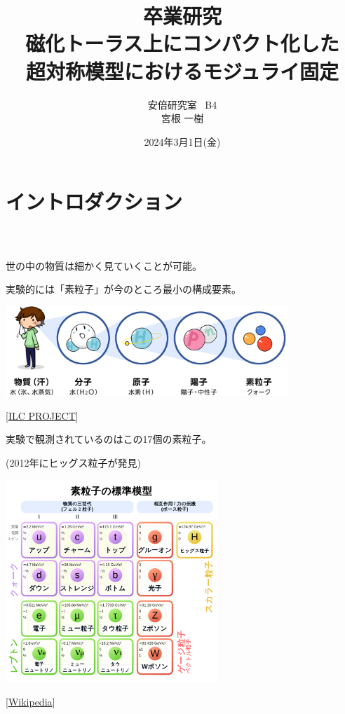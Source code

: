 \documentclass[
  unicode,a4paper,11pt,
  xcolor = {dvipsnames,svgnames},
  hyperref ={colorlinks=true,citecolor=Navy,linkcolor=NavyBlue,urlcolor=purple},
  ja=standard,lualatex
]{beamer}
\title{
  卒業研究
  \texorpdfstring{\\}{}
  \texorpdfstring{\vspace*{5pt}}{}
  {\LARGE
    磁化トーラス上にコンパクト化した
    \\
    超対称模型におけるモジュライ固定
  }
}
\author{
  安倍研究室 \ B4
  \texorpdfstring{\\}{}
  \texorpdfstring{\vspace*{3pt}}{}
  宮根 一樹
}
\date{2024年3月1日(金)}
\begin{document}
\begin{frame}
  \titlepage
\end{frame}


\section{イントロダクション}

\begin{frame}[plain]
  \frametitle{\ }
  \huge \secname
\end{frame}

\begin{frame}
  世の中の物質は細かく見ていくことが可能。

  実験的には「素粒子」が今のところ最小の構成要素。

  \begin{center}
    \includegraphics[width=0.8\textwidth]{fig/ILCproject.png}       

    \vspace*{-5pt}
    { \small
      \hspace*{6cm}
      [\href{https://aaa-sentan.org/ILC/about_physics/anatomy01.html}{ILC PROJECT}]
    }   
  \end{center}

\end{frame}

\begin{frame}
  
  \begin{center}

    実験で観測されているのはこの17個の素粒子。
  
    (2012年にヒッグス粒子が発見)

    \includegraphics[width=0.6\textwidth]{fig/SM.png}  

    \vspace*{-15pt}
    { \small
      \hspace*{4cm}
      [\href{https://ja.wikipedia.org/wiki/標準模型}{Wikipedia}]
    }
  \end{center}

\end{frame}
\end{document}
